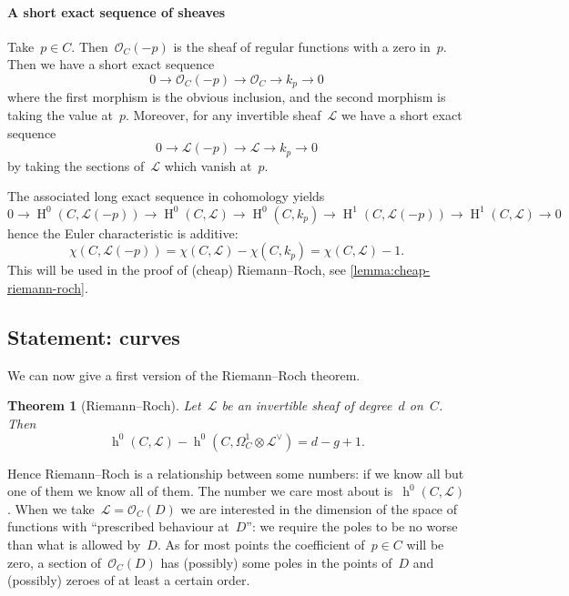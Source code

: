 \documentclass[10pt,a4paper]{article}
\theoremstyle{lecture}
\newtheorem{theorem}{Theorem}
\DeclareMathOperator\hh{h}
\DeclareMathOperator\HH{H}
\begin{document}
\paragraph{A short exact sequence of sheaves}
Take~$p\in C$. Then~$\mathcal{O}_C(-p)$ is the sheaf of regular functions with a zero in~$p$. Then we have a short exact sequence
\begin{equation}
  0\to\mathcal{O}_C(-p)\to\mathcal{O}_C\to k_p\to 0
\end{equation}
where the first morphism is the obvious inclusion, and the second morphism is taking the value at~$p$. Moreover, for any invertible sheaf~$\mathcal{L}$ we have a short exact sequence
\begin{equation}
  0\to\mathcal{L}(-p)\to\mathcal{L}\to k_p\to 0
\end{equation}
by taking the sections of~$\mathcal{L}$ which vanish at~$p$.

The associated long exact sequence in cohomology yields
\begin{equation}
  0\to\HH^0(C,\mathcal{L}(-p))\to\HH^0(C,\mathcal{L})\to\HH^0(C,k_p)\to\HH^1(C,\mathcal{L}(-p))\to\HH^1(C,\mathcal{L})\to 0
\end{equation}
hence the Euler characteristic is additive:
\begin{equation}
  \chi(C,\mathcal{L}(-p))=\chi(C,\mathcal{L})-\chi(C,k_p)=\chi(C,\mathcal{L})-1.
\end{equation}
This will be used in the proof of (cheap) Riemann--Roch, see \cref{lemma:cheap-riemann-roch}.

\subsection{Statement: curves}
\label{subsection:statement-curves}
We can now give a first version of the Riemann--Roch theorem.
\begin{theorem}[Riemann--Roch]
  \label{theorem:riemann-roch}
  Let~$\mathcal{L}$ be an invertible sheaf of degree~$d$ on~$C$. Then
  \begin{equation}
    \hh^0(C,\mathcal{L})-\hh^0(C,\Omega_C^1\otimes\mathcal{L}^\vee)=d-g+1.
  \end{equation}
\end{theorem}
Hence Riemann--Roch is a relationship between some numbers: if we know all but one of them we know all of them. The number we care most about is~$\hh^0(C,\mathcal{L})$. When we take~$\mathcal{L}=\mathcal{O}_C(D)$ we are interested in the dimension of the space of functions with ``prescribed behaviour at~$D$'': we require the poles to be no worse than what is allowed by~$D$. As for most points the coefficient of~$p\in C$ will be zero, a section of~$\mathcal{O}_C(D)$ has (possibly) some poles in the points of~$D$ and (possibly) zeroes of at least a certain order.
\end{document}
